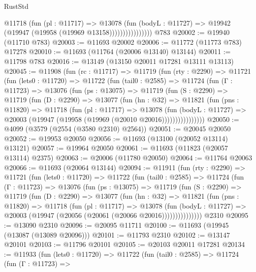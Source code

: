 \begin{lexlean}{RustStd}
\begin{coremodule}
                        @11718
                          (fun (pl : @11717) =>
                          @13078
                            (fun (bodyL : @11727) =>
                            @19942 (@19947 (@19958 (@19969 @13158))))))))))))))))
    @783
@20002 := @19940 (@11710 @783)
@20003 := @11693 @20002
@20006 := @11772 (@11773 @783) @17278
@20010 := @11693 (@11764 (@20006 @13140) @13144)
@20011 := @11798 @783
@20016 := @13149 (@13150 @20011 @17281 @13111 @13113)
@20045 := @11908
    (fun (rc : @11717) =>
    @11719
      (fun (rty : @2290) =>
      @11721
        (fun (lets0 : @11720) =>
        @11722
          (fun (tail0 : @2585) =>
          @11724
            (fun (Γ : @11723) =>
            @13076
              (fun (ps : @13075) =>
              @11719
                (fun (S : @2290) =>
                @11719
                  (fun (D : @2290) =>
                  @13077
                    (fun (hn : @32) =>
                    @11821
                      (fun (pns : @11820) =>
                      @11718
                        (fun (pl : @11717) =>
                        @13078
                          (fun (bodyL : @11727) =>
                          @20003 (@19947 (@19958 (@19969 (@20010 @20016))))))))))))))))
@20050 := @4099 (@3579 (@2554 (@3580 @2310) @2564))
@20051 := @20045 @20050
@20052 := @19953 @20050
@20056 := @11693 (@13100 (@20052 @13114) @13121)
@20057 := @19964 @20050
@20061 := @11693 (@11823 (@20057 @13114) @2375)
@20063 := @20006 (@11780 @20050)
@20064 := @11764 @20063
@20066 := @11693 (@20064 @13144)
@20094 := @11911
    (fun (rty : @2290) =>
    @11721
      (fun (lets0 : @11720) =>
      @11722
        (fun (tail0 : @2585) =>
        @11724
          (fun (Γ : @11723) =>
          @13076
            (fun (ps : @13075) =>
            @11719
              (fun (S : @2290) =>
              @11719
                (fun (D : @2290) =>
                @13077
                  (fun (hn : @32) =>
                  @11821
                    (fun (pns : @11820) =>
                    @11718
                      (fun (pl : @11717) =>
                      @13078
                        (fun (bodyL : @11727) =>
                        @20003 (@19947 (@20056 (@20061 (@20066 @20016)))))))))))))))
    @2310
@20095 := @13090 @2310
@20096 := @20095 @11711
@20100 := @11693 (@19945 (@13087 (@13089 @20096)))
@20101 := @11793 @2310
@20102 := @13147 @20101
@20103 := @11796 @20101
@20105 := @20103 @20011 @17281
@20134 := @11933
    (fun (lets0 : @11720) =>
    @11722
      (fun (tail0 : @2585) =>
      @11724
        (fun (Γ : @11723) =>

\end{coremodule}
\end{lexlean}
